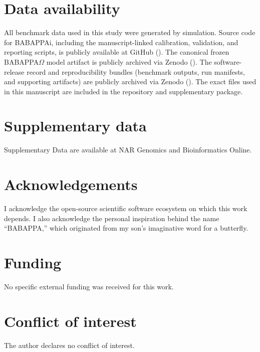 \documentclass[11pt]{article}
\begin{document}
\section*{Data availability}

All benchmark data used in this study were generated by simulation. Source code for BABAPPAi, including the manuscript-linked calibration, validation, and reporting scripts, is publicly available at GitHub (\cite{BABAPPAiRepo}). The canonical frozen BABAPPA$\Omega$ model artifact is publicly archived via Zenodo (\cite{BABAPPAOmegaModel}). The software-release record and reproducibility bundles (benchmark outputs, run manifests, and supporting artifacts) are publicly archived via Zenodo (\cite{BABAPPAiZenodo,BABAPPAiBenchmarkArchive}). The exact files used in this manuscript are included in the repository and supplementary package.

\section*{Supplementary data}

Supplementary Data are available at NAR Genomics and Bioinformatics Online.

\section*{Acknowledgements}

I acknowledge the open-source scientific software ecosystem on which this work depends. I also acknowledge the personal inspiration behind the name ``BABAPPA,'' which originated from my son's imaginative word for a butterfly.

\section*{Funding}

No specific external funding was received for this work.

\section*{Conflict of interest}

The author declares no conflict of interest.
\end{document}
